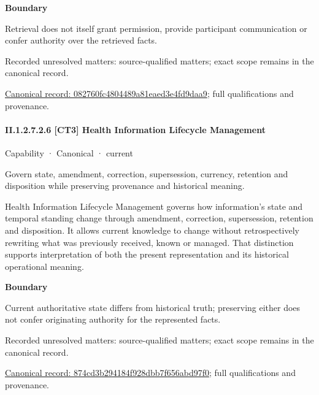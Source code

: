 \textbf{Boundary}



Retrieval does not itself grant permission, provide participant communication or confer authority over the retrieved facts.


{\small Recorded unresolved matters: source-qualified matters; exact scope remains in the canonical record.}\par
{\footnotesize \href{../../../../continuum/strategy/capability/082760fc4804489a81eaed3e4fd9daa9.md}{Canonical record: 082760fc4804489a81eaed3e4fd9daa9}; full qualifications and provenance.}\par
\paragraph*{II.1.2.7.2.6 [CT3] Health Information Lifecycle Management}
\label{navigation:II.1.2.7.2.6}

\label{element:874cd3b294184f928dbb7f656abd97f0}
{\small Capability · Canonical · current}\par

Govern state, amendment, correction, supersession, currency, retention and disposition while preserving provenance and historical meaning.



Health Information Lifecycle Management governs how information's state and temporal standing change through amendment, correction, supersession, retention and disposition. It allows current knowledge to change without retrospectively rewriting what was previously received, known or managed. That distinction supports interpretation of both the present representation and its historical operational meaning.



\textbf{Boundary}



Current authoritative state differs from historical truth; preserving either does not confer originating authority for the represented facts.


{\small Recorded unresolved matters: source-qualified matters; exact scope remains in the canonical record.}\par
{\footnotesize \href{../../../../continuum/strategy/capability/874cd3b294184f928dbb7f656abd97f0.md}{Canonical record: 874cd3b294184f928dbb7f656abd97f0}; full qualifications and provenance.}\par
